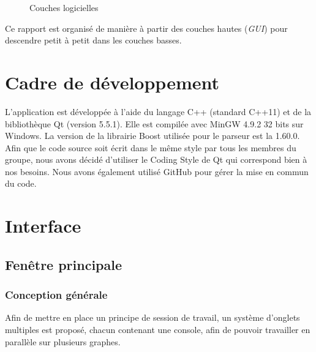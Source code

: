 \documentclass[french]{article}
\begin{document}
		\begin{figure}[H]
			\centering
			\caption{Couches logicielles}
			\label{couchesLogicielles}
		\end{figure}
		
		Ce rapport est organisé de manière à partir des couches hautes (\textit{GUI}) pour descendre petit à petit dans les couches basses.
	
	\section{Cadre de développement} 
		L'application est développée à l'aide du langage C++ (standard C++11) et de la bibliothèque Qt (version 5.5.1). Elle est compilée avec MinGW 4.9.2 32 bits sur Windows. La version de la librairie Boost utilisée pour le parseur est la 1.60.0. Afin que le code source soit écrit dans le même style par tous les membres du groupe, nous avons décidé d'utiliser le Coding Style de Qt \cite{qtStyle} qui correspond bien à nos besoins. Nous avons également utilisé GitHub pour gérer la mise en commun du code.
			
	\section{Interface}
	\subsection{Fenêtre principale}
	\subsubsection{Conception générale}
	Afin de mettre en place un principe de session de travail, un système d'onglets multiples est proposé, chacun contenant une console, afin de pouvoir travailler en parallèle sur plusieurs graphes.
\end{document}
